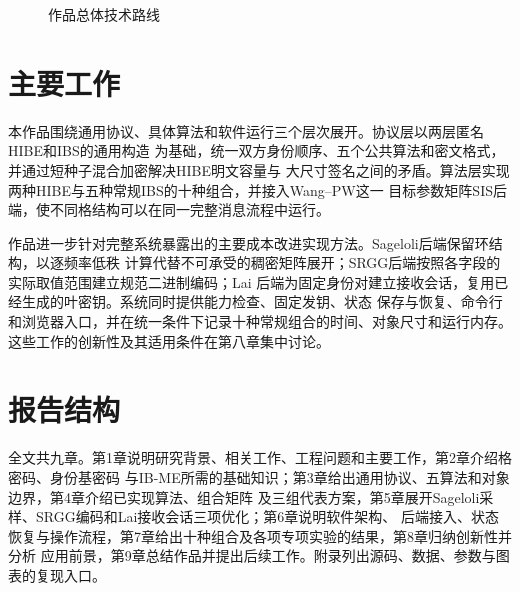 \begin{figure}[H]
\centering
{}
\caption{作品总体技术路线}
\label{fig:work-overview}
\end{figure}

\section{主要工作}

本作品围绕通用协议、具体算法和软件运行三个层次展开。协议层以两层匿名HIBE和IBS的通用构造
为基础，统一双方身份顺序、五个公共算法和密文格式，并通过短种子混合加密解决HIBE明文容量与
大尺寸签名之间的矛盾。算法层实现两种HIBE与五种常规IBS的十种组合，并接入Wang--PW这一
目标参数矩阵SIS后端，使不同格结构可以在同一完整消息流程中运行。

作品进一步针对完整系统暴露出的主要成本改进实现方法。Sageloli后端保留环结构，以逐频率低秩
计算代替不可承受的稠密矩阵展开；SRGG后端按照各字段的实际取值范围建立规范二进制编码；Lai
后端为固定身份对建立接收会话，复用已经生成的叶密钥。系统同时提供能力检查、固定发钥、状态
保存与恢复、命令行和浏览器入口，并在统一条件下记录十种常规组合的时间、对象尺寸和运行内存。
这些工作的创新性及其适用条件在第八章集中讨论。

\section{报告结构}

全文共九章。第1章说明研究背景、相关工作、工程问题和主要工作，第2章介绍格密码、身份基密码
与IB-ME所需的基础知识；第3章给出通用协议、五算法和对象边界，第4章介绍已实现算法、组合矩阵
及三组代表方案，第5章展开Sageloli采样、SRGG编码和Lai接收会话三项优化；第6章说明软件架构、
后端接入、状态恢复与操作流程，第7章给出十种组合及各项专项实验的结果，第8章归纳创新性并分析
应用前景，第9章总结作品并提出后续工作。附录列出源码、数据、参数与图表的复现入口。
